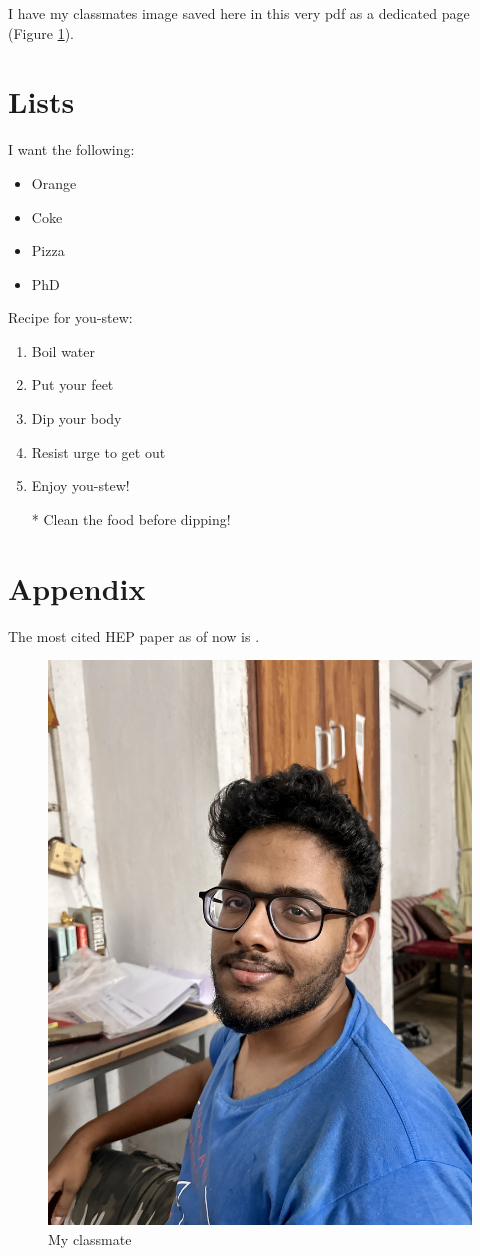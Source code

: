 \documentclass{article}
\begin{document}
I have my classmates image saved here in this very pdf as a dedicated page (Figure \ref{fig:enter-label}).

\section{Lists}

I want the following:
\begin{itemize}
    \item Orange
    \item Coke
    \item Pizza
    \item PhD
\end{itemize}

Recipe for you-stew:
\begin{enumerate}
    \item Boil water
    \item Put your feet
    \item Dip your body
    \item Resist urge to get out
    \item Enjoy you-stew!
    \item[*] Clean the food before dipping!
\end{enumerate}

\section*{Appendix}

The most cited HEP paper as of now is \cite{Maldacena:1997re}.

\begin{figure}[p]
    \centering
    \includegraphics[width=\textwidth]{Image.jpeg}
    \caption{My classmate}
    \label{fig:enter-label}
\end{figure}



\end{document}
